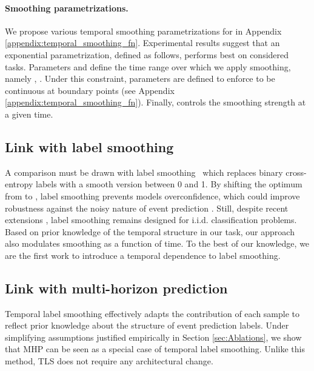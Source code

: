 \documentclass[nohyperref]{article}
\begin{document}
\paragraph{Smoothing parametrizations.} We propose various temporal smoothing parametrizations for  in Appendix \ref{appendix:temporal_smoothing_fn}. Experimental results suggest that an exponential parametrization, defined as follows, performs best on considered tasks. 
Parameters  and  define the time range over which we apply smoothing, namely , . Under this constraint, parameters  are defined to enforce  to be continuous at boundary points (see Appendix \ref{appendix:temporal_smoothing_fn}). Finally,  controls the smoothing strength at a given time. 

\subsection{Link with label smoothing}
A comparison must be drawn with label smoothing~\citep{DBLP:conf/cvpr/SzegedyVISW16} which replaces binary cross-entropy labels  with a smooth version  between 0 and 1. By shifting the optimum from  to , label smoothing prevents models overconfidence, which could improve robustness against the noisy nature of event prediction \citep{DBLP:conf/icml/LukasikBMK20, DBLP:conf/nips/MullerKH19}. Still, despite recent extensions \cite{DBLP:conf/aistats/LiDB20,DBLP:conf/acl/MeisterSC20,DBLP:conf/aaai/LienenH21}, label smoothing remains designed for i.i.d. classification problems. Based on prior knowledge of the temporal structure in our task, our approach also modulates smoothing as a function of time. To the best of our knowledge, we are the first work to introduce a temporal dependence to label smoothing. 

\subsection{Link with multi-horizon prediction}\label{sec:link_mhp}

Temporal label smoothing effectively adapts the contribution of each sample to reflect prior knowledge about the structure of event prediction labels. Under simplifying assumptions justified empirically in Section \ref{sec:Ablations}, we show that MHP can be seen as a special case of temporal label smoothing.  Unlike this method, TLS does not require any architectural change. 
\end{document}
